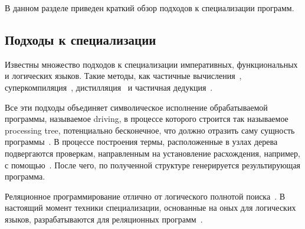 
\label{sec:relatedworks}

В данном разделе приведен краткий обзор подходов к специализации программ. 

\subsection{Подходы к специализации}
Известны множество подходов к специализации императивных, функциональных и логических языков. Такие методы, как частичные вычисления~\cite{pargen}, суперкомпиляция~\cite{supercompiler}, дистилляция~\cite{distillation} и частичная дедукция~\cite{parded}. 

Все эти подходы объединяет символическое исполнение обрабатываемой программы, называемое driving, в процессе которого строится так называемое processing tree, потенциально бесконечное, что должно отразить саму сущность программы~\cite{supercompiler}. В процессе построения термы, расположенные в узлах дерева подвергаются проверкам, направленным на установление расхождения, например, с помощью~\cite{embedding}. После чего, по полученной структуре генерируется результирующая программа.

Реляционное программирование отлично от логического полнотой поиска~\cite{miniKanren}. В настоящий момент техники специализации, основанные на оных для логических языков, разрабатываются для реляционных программ~\cite{miniDeduction}. 
